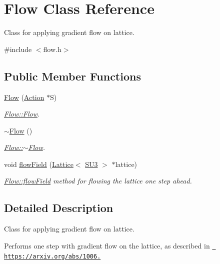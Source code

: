 \hypertarget{class_flow}{}\section{Flow Class Reference}
\label{class_flow}


Class for applying gradient flow on lattice.  




{\ttfamily \#include $<$flow.\+h$>$}

\subsection*{Public Member Functions}
\begin{DoxyCompactItemize}
\item 
\mbox{\hyperlink{class_flow_a25ae85599c0ae330374f0840efde7ebc}{Flow}} (\mbox{\hyperlink{class_action}{Action}} $\ast$S)
\begin{DoxyCompactList}\small\item\em \mbox{\hyperlink{class_flow_a25ae85599c0ae330374f0840efde7ebc}{Flow\+::\+Flow}}. \end{DoxyCompactList}\item 
\mbox{\hyperlink{class_flow_a5991efa6e8cf88c4ef2125cc727db333}{$\sim$\+Flow}} ()
\begin{DoxyCompactList}\small\item\em \mbox{\hyperlink{class_flow_a5991efa6e8cf88c4ef2125cc727db333}{Flow\+::$\sim$\+Flow}}. \end{DoxyCompactList}\item 
void \mbox{\hyperlink{class_flow_a284b490ddedc9cf5d0f2ab0660c328f6}{flow\+Field}} (\mbox{\hyperlink{class_lattice}{Lattice}}$<$ \mbox{\hyperlink{class_s_u3}{S\+U3}} $>$ $\ast$lattice)
\begin{DoxyCompactList}\small\item\em \mbox{\hyperlink{class_flow_a284b490ddedc9cf5d0f2ab0660c328f6}{Flow\+::flow\+Field}} method for flowing the lattice one step ahead. \end{DoxyCompactList}\end{DoxyCompactItemize}


\subsection{Detailed Description}
Class for applying gradient flow on lattice. 

Performs one step with gradient flow on the lattice, as described in \href{https://arxiv.org/abs/1006.4518}{\texttt{ https\+://arxiv.\+org/abs/1006.}}

